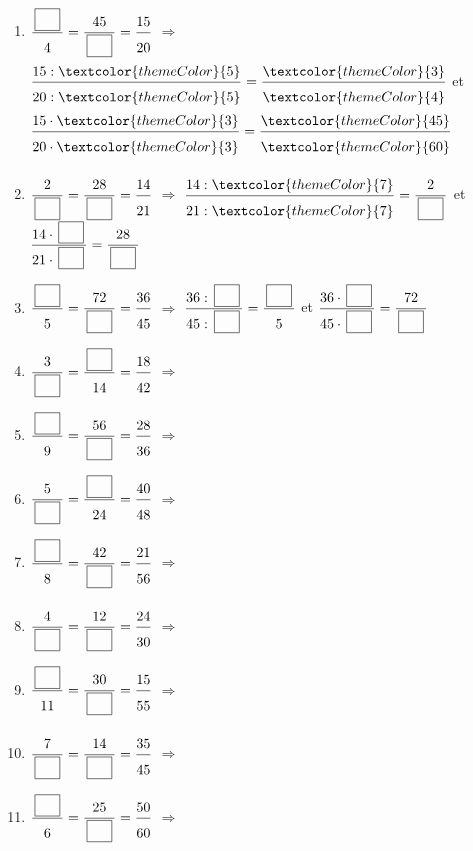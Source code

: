 \begin{enumerate}[leftmargin=*,align=parleft, label=\alph*), itemsep=9pt]
\item $\FA{\CaseC}{4}=\FA{45}{\CaseC}=\FA{15}{20}$ \quad $\Longrightarrow$ \quad $\FA{15 : \textcolor{themeColor}{5}}{20 : \textcolor{themeColor}{5}}=\FA{\textcolor{themeColor}{3}}{\textcolor{themeColor}{4}}$ \quad et \quad $\FA{15 \cdot \textcolor{themeColor}{3}}{20 \cdot \textcolor{themeColor}{3}}=\FA{\textcolor{themeColor}{45}}{\textcolor{themeColor}{60}}$
\item $\FA{2}{\CaseC}=\FA{28}{\CaseC}=\FA{14}{21}$ \quad $\Longrightarrow$ \quad $\FA{14 : \textcolor{themeColor}{7}}{21 : \textcolor{themeColor}{7}}=\FA{2}{\CaseC}$ \quad et \quad $\FA{14 \cdot \CaseC}{21 \cdot \CaseC}=\FA{28}{\CaseC}$
\item $\FA{\CaseC}{5}=\FA{72}{\CaseC}=\FA{36}{45}$ \quad $\Longrightarrow$ \quad $\FA{36 : \CaseC}{45 : \CaseC}=\FA{\CaseC}{5}$ \quad et \quad $\FA{36 \cdot \CaseC}{45 \cdot \CaseC}=\FA{72}{\CaseC}$
\item $\FA{3}{\CaseC}=\FA{\CaseC}{14}=\FA{18}{42}$ \quad $\Longrightarrow$
\item $\FA{\CaseC}{9}=\FA{56}{\CaseC}=\FA{28}{36}$ \quad $\Longrightarrow$
\item $\FA{5}{\CaseC}=\FA{\CaseC}{24}=\FA{40}{48}$ \quad $\Longrightarrow$
\item $\FA{\CaseC}{8}=\FA{42}{\CaseC}=\FA{21}{56}$ \quad $\Longrightarrow$
\item $\FA{4}{\CaseC}=\FA{12}{\CaseC}=\FA{24}{30}$ \quad $\Longrightarrow$
\item $\FA{\CaseC}{11}=\FA{30}{\CaseC}=\FA{15}{55}$ \quad $\Longrightarrow$
\item $\FA{7}{\CaseC}=\FA{14}{\CaseC}=\FA{35}{45}$ \quad $\Longrightarrow$
\item $\FA{\CaseC}{6}=\FA{25}{\CaseC}=\FA{50}{60}$ \quad $\Longrightarrow$
\end{enumerate}
 
\newpage
{}
 
